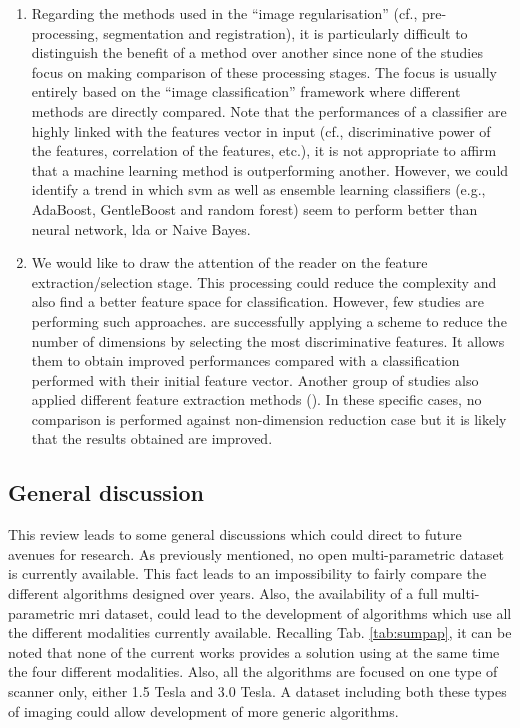 {\begin{enumerate}
	\item Regarding the methods used in the ``image regularisation'' (cf., pre-processing, segmentation and registration), it is particularly difficult to distinguish the benefit of a method over another since none of the studies focus on making comparison of these processing stages. The focus is usually entirely based on the ``image classification'' framework where different methods are directly compared. Note that the performances of a classifier are highly linked with the features vector in input (cf., discriminative power of the features, correlation of the features, etc.), it is not appropriate to affirm that a machine learning method is outperforming another. However, we could identify a trend in which \ac{svm} as well as ensemble learning classifiers (e.g., AdaBoost, GentleBoost and random forest) seem to perform better than neural network, \ac{lda} or Naive Bayes.
	
	\item We would like to draw the attention of the reader on the feature extraction/selection stage. This processing could reduce the complexity and also find a better feature space for classification. However, few studies are performing such approaches. \cite{Niaf2011,Niaf2012} are successfully applying a scheme to reduce the number of dimensions by selecting the most discriminative features. It allows them to obtain improved performances compared with a classification performed with their initial feature vector. Another group of studies also applied different feature extraction methods (\cite{Viswanath2008a,Viswanath2008,Viswanath2012,Tiwari2007,Tiwari2008,Tiwari2009,Tiwari2010,Tiwari2012,Tiwari2013}). In these specific cases, no comparison is performed against non-dimension reduction case but it is likely that the results obtained are improved.
\end{enumerate}}

\subsection{General discussion}

This review leads to some general discussions which could direct to future avenues for research. As previously mentioned, no open multi-parametric dataset is currently available. This fact leads to an impossibility to fairly compare the different algorithms designed over years. Also, the availability of a full multi-parametric \ac{mri} dataset, could lead to the development of algorithms which use all the different modalities currently available. Recalling Tab. \ref{tab:sumpap}, it can be noted that none of the current works provides a solution using at the same time the four different modalities. Also, all the algorithms are focused on one type of scanner only, either 1.5 Tesla and 3.0 Tesla. A dataset including both these types of imaging could allow development of more generic algorithms.


